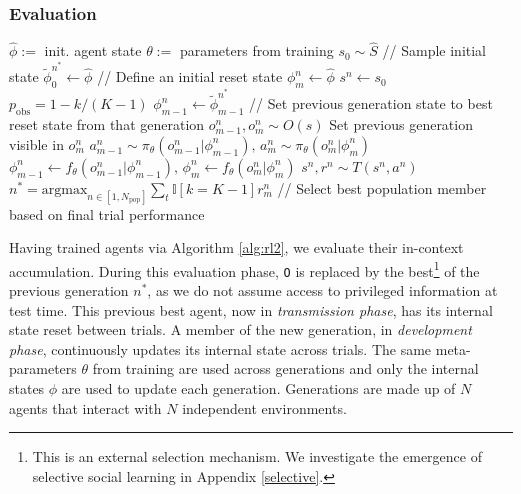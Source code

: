 \documentclass{article}
\begin{document}
\subsubsection{Evaluation}
\label{eval}
\begin{algorithm}[H]
\caption{In-Context Accumulation During Evaluation}\label{alg:ica}
\begin{algorithmic}[1]
\STATE $\hat{\phi} :=$ init. agent state
\STATE $\theta :=$ parameters from training
\STATE $s_0 \sim \hat{S}$ // Sample initial state
\STATE $\tilde{\phi}^{n^*}_0 \gets \hat{\phi}$ // Define an initial reset state
\STATE $\phi^n_m \gets \hat{\phi}$
\STATE $s^n \leftarrow s_0$
\ENDIF
\STATE $p_{\text{obs}} = 1 - k/(K-1)$
\STATE $\phi^n_{m-1} \gets \tilde{\phi}^{n^*}_{m-1}$ // Set previous generation state to best reset state from that generation
\STATE $o^{n}_{m-1}, o^{n}_m \sim O(s)$
\STATE Set previous generation visible in $o^n_m$
\ENDIF
\STATE $a^n_{m-1} \sim \pi_\theta(o^n_{m-1} | \phi^n_{m-1}), \, a^n_m \sim \pi_\theta(o^n_m | \phi^n_m)$
\STATE $\phi^n_{m-1} \gets f_\theta(o^n_{m-1} | \phi^n_{m-1}), \, \phi^n_m \gets f_\theta(o^n_m | \phi^n_m)$
\STATE $s^n, r^n \sim T(s^n, a^n)$
\ENDWHILE
\ENDFOR
\STATE $n^{*} = \text{argmax}_{n \in [1, N_\text{pop}]} \sum_t \mathbb{I}[k = K - 1] r^n_m$ // Select best population member based on final trial performance
\ENDFOR
\ENDFOR
\end{algorithmic}
\end{algorithm}
Having trained agents via Algorithm \ref{alg:rl2}, we evaluate their in-context accumulation. During this evaluation phase, \texttt{O} is replaced by the best\footnote{This is an external selection mechanism. We investigate the emergence of selective social learning in Appendix \ref{selective}.} of the previous generation $n^*$, as we do not assume access to privileged information at test time. This previous best agent, now in \textit{transmission phase}, has its internal state reset between trials. A member of the new generation, in \textit{development phase}, continuously updates its internal state across trials. The same meta-parameters $\theta$ from training are used across generations and only the internal states $\phi$ are used to update each generation. Generations are made up of $N$ agents that interact with $N$ independent environments.
\end{document}
